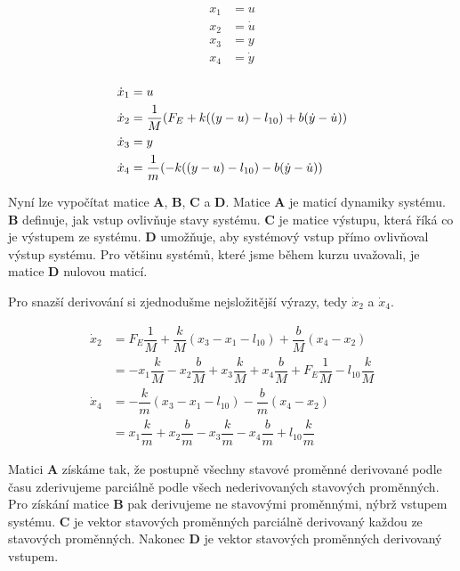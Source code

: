 \noindent
\begin{minipage}[t]{.5\textwidth}
    \begin{align*}
        x_1 &= u \\
        x_2 &= \dot{u} \\
        x_3 &= y \\
        x_4 &= \dot{y} \\
    \end{align*}
\end{minipage}%
\begin{minipage}[t]{.5\textwidth}
    \begin{align*}
        \dot{x}_1 &= u \\
        \dot{x}_2 &= \dfrac{1}{M} ( F_E + k((y - u) - l_{10}) + b(\dot{y} - \dot{u}) ) \\
        \dot{x}_3 &= y \\
        \dot{x}_4 &= \dfrac{1}{m} ( - k((y - u) - l_{10}) - b(\dot{y} - \dot{u}) ) \\
    \end{align*}
\end{minipage}

Nyní lze vypočítat matice \textbf{A}, \textbf{B}, \textbf{C} a \textbf{D}. Matice \textbf{A} je maticí dynamiky systému. \textbf{B} definuje, jak vstup ovlivňuje stavy systému. \textbf{C} je matice výstupu, která říká co je výstupem ze systému. \textbf{D} umožňuje, aby systémový vstup přímo ovlivňoval výstup systému. Pro většinu systémů, které jsme během kurzu uvažovali, je matice \textbf{D} nulovou maticí.

Pro snazší derivování si zjednodušme nejsložitější výrazy, tedy \( \dot{x}_2 \) a \( \dot{x}_4 \).

\begin{align*}
    \dot{x}_2   &= F_E \dfrac{1}{M} + \dfrac{k}{M} (x_3 - x_1 - l_{10}) + \dfrac{b}{M} (x_4 - x_2) \\
                &= - x_1 \dfrac{k}{M} - x_2 \dfrac{b}{M} + x_3 \dfrac{k}{M} + x_4 \dfrac{b}{M} + F_E \dfrac{1}{M} - l_{10} \dfrac{k}{M} \\
    \dot{x}_4   &= - \dfrac{k}{m} (x_3 - x_1 - l_{10}) - \dfrac{b}{m} (x_4 - x_2) \\
                &= x_1 \dfrac{k}{m} + x_2 \dfrac{b}{m} - x_3 \dfrac{k}{m} - x_4 \dfrac{b}{m} + l_{10} \dfrac{k}{m}
\end{align*}

Matici \textbf{A} získáme tak, že postupně všechny stavové proměnné derivované podle času zderivujeme parciálně podle všech nederivovaných stavových proměnných. Pro získání matice \textbf{B} pak derivujeme ne stavovými proměnnými, nýbrž vstupem systému. \textbf{C} je vektor stavových proměnných parciálně derivovaný každou ze stavových proměnných. Nakonec \textbf{D} je vektor stavových proměnných derivovaný vstupem.

